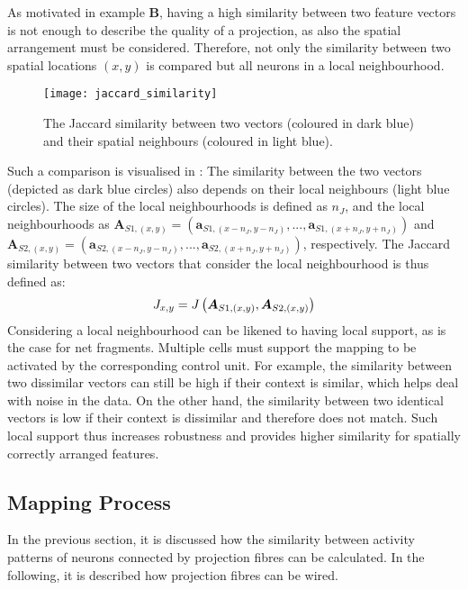 As motivated in  example $\boldsymbol{B}$, having a high similarity between two feature vectors is not enough to describe the quality of a projection, as also the spatial arrangement must be considered.
Therefore, not only the similarity between two spatial locations $(x,y)$ is compared but all neurons in a local neighbourhood.
\begin{figure}[h]
    \centering
    \texttt{[image: jaccard\_similarity]}
    \caption[Similarity between two vectors and their spatial neighbours]{The Jaccard similarity between two vectors (coloured in dark blue) and their spatial neighbours (coloured in light blue).}
\end{figure}
Such a comparison is visualised in :
The similarity between the two vectors (depicted as dark blue circles) also depends on their local neighbours (light blue circles).
The size of the local neighbourhoods is defined as $n_J$, and the local neighbourhoods as $\boldsymbol{A}_{S1,(x,y)} = ( \boldsymbol{a}_{S1,(x-n_J,y-n_J)}, ..., \boldsymbol{a}_{S1,(x+n_J,y+n_J)} )$ and $\boldsymbol{A}_{S2,(x,y)} = ( \boldsymbol{a}_{S2,(x-n_J,y-n_J)}, ..., \boldsymbol{a}_{S2,(x+n_J,y+n_J)} )$, respectively.
The Jaccard similarity between two vectors that consider the local neighbourhood is thus defined as:
%
\begin{align}\eqlbl{jaccard2}
	J_{x,y} = J \left( \boldsymbol{A}_{S1,(x,y)}, \boldsymbol{A}_{S2,(x,y)} \right)
\end{align}
%
Considering a local neighbourhood can be likened to having local support, as is the case for net fragments. Multiple cells must support the mapping to be activated by the corresponding control unit. For example, the similarity between two dissimilar vectors can still be high if their context is similar, which helps deal with noise in the data.
On the other hand, the similarity between two identical vectors is low if their context is dissimilar and therefore does not match.
Such local support thus increases robustness and provides higher similarity for spatially correctly arranged features.


\subsection{Mapping Process}
In the previous section, it is discussed how the similarity between activity patterns of neurons connected by projection fibres can be calculated.
In the following, it is described how projection fibres can be wired.

